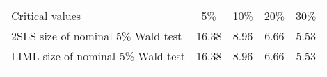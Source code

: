 \begin{center}
\begin{tabular}{lcccc}
\hline \noalign{\smallskip}Critical values & 5\% & 10\% & 20\% & 30\%\\
\noalign{\smallskip}\hline \noalign{\smallskip}2SLS size of nominal 5\% Wald test & 16.38 & 8.96 & 6.66 & 5.53\\
LIML size of nominal 5\% Wald test  & 16.38 & 8.96 & 6.66 & 5.53\\
\noalign{\smallskip}\hline\end{tabular}\\
\end{center}
